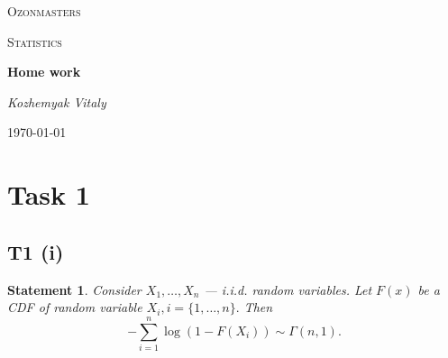 \documentclass[a4paper, 12pt]{article}
\newtheorem{statement}{Statement}
\begin{document}
 

\begin{titlepage}
	\centering
	{\scshape\LARGE Ozonmasters \par}
	\vspace{1cm}
	{\scshape\Large Statistics \par}
	\vspace{1.5cm}
	{\huge\bfseries Home work \par}
	\vspace{2cm}
	{\Large\itshape Kozhemyak Vitaly \par}
	\vfill

	{\large \today\par}
\end{titlepage}
  
\tableofcontents

\newpage
\section*{Task 1}
\subsection*{T1 (i)}

\begin{tcolorbox}[enhanced,width=\textwidth,center upper,
    fontupper=\large\bfseries,drop fuzzy shadow southwest,
    colframe=red!50!black,colback=yellow!30]
\begin{statement}
Consider $X_1, \ldots, X_n$ --- i.i.d. random variables. Let $F(x)$ be a CDF of random variable $X_i, i = \{1, \ldots, n\}.$ Then 
$$
- \sum \limits_{i=1}^n \log(1 - F(X_i)) \sim \Gamma (n, 1).
$$
\end{statement}
\end{tcolorbox}
\end{document}
